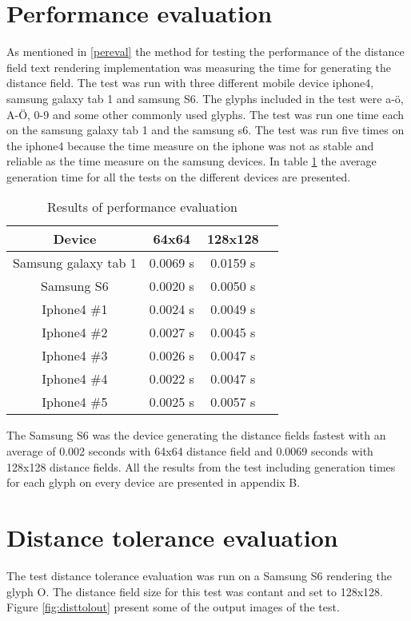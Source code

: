 \section{Performance evaluation}
As mentioned in \ref{pereval} the method for testing the performance of the distance field text rendering implementation was measuring the time for generating the distance field. The test was run with three different mobile device iphone4, samsung galaxy tab 1 and samsung S6. The glyphs included in the test were a-ö, A-Ö, 0-9 and some other commonly used glyphs. The test was run one time each on the samsung galaxy tab 1 and the samsung s6. The test was run five times on the iphone4 because the time measure on the iphone was not as stable and reliable as the time measure on the samsung devices. In table \ref{table:perfeval} the average generation time for all the tests on the different devices are presented.

\begin{table}[H]
\caption{Results of performance evaluation}
\centering
\begin{tabular}{c c c c}
\hline
\hline %
Device & 64x64 & 128x128\\ [0.5ex] %
\hline
Samsung galaxy tab 1 & 0.0069 s & 0.0159 s \\
Samsung S6 & 0.0020 s & 0.0050 s \\
Iphone4 \#1 & 0.0024 s & 0.0049 s \\
Iphone4 \#2 & 0.0027 s & 0.0045 s \\
Iphone4 \#3 & 0.0026 s & 0.0047 s \\
Iphone4 \#4 & 0.0022 s & 0.0047 s \\
Iphone4 \#5 & 0.0025 s & 0.0057 s \\ [1ex]
\hline
\end{tabular}
\label{table:perfeval}
\end{table}
The Samsung S6 was the device generating the distance fields fastest with an average of 0.002 seconds with 64x64 distance field and 0.0069 seconds with 128x128 distance fields. All the results from the test including generation times for each glyph on every device are presented in appendix B.
\section{Distance tolerance evaluation}
The test distance tolerance evaluation was run on a Samsung S6 rendering the glyph O. The distance field size for this test was contant and set to 128x128. Figure \ref{fig:disttolout} present some of the output images of the test.

